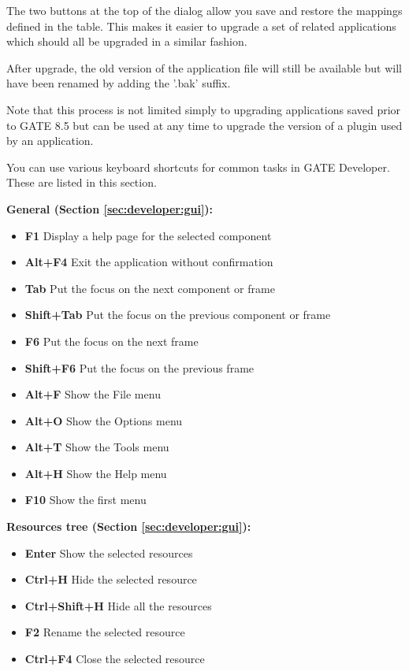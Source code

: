 The two buttons at the top of the dialog allow you save and restore the mappings defined in the table. This makes it easier to upgrade a set of
related applications which should all be upgraded in a similar fashion.

After upgrade, the old version of the application file will still be available but will have been renamed by adding the '.bak' suffix.

Note that this process is not limited simply to upgrading applications saved prior to GATE 8.5 but can be used at any time to upgrade
the version of a plugin used by an application.


You can use various keyboard shortcuts for common tasks in GATE Developer.
These are listed in this section.

{\bf General (Section \ref{sec:developer:gui}):}

\begin{itemize}
\item {\bf F1} Display a help page for the selected component
\item {\bf Alt+F4} Exit the application without confirmation
\item {\bf Tab} Put the focus on the next component or frame
\item {\bf Shift+Tab} Put the focus on the previous component or frame
\item {\bf F6} Put the focus on the next frame
\item {\bf Shift+F6} Put the focus on the previous frame
\item {\bf Alt+F} Show the File menu
\item {\bf Alt+O} Show the Options menu
\item {\bf Alt+T} Show the Tools menu
\item {\bf Alt+H} Show the Help menu
\item {\bf F10} Show the first menu
\end{itemize}


{\bf Resources tree (Section \ref{sec:developer:gui}):}

\begin{itemize}
\item {\bf Enter} Show the selected resources
\item {\bf Ctrl+H} Hide the selected resource
\item {\bf Ctrl+Shift+H} Hide all the resources
\item {\bf F2} Rename the selected resource
\item {\bf Ctrl+F4} Close the selected resource
\end{itemize}

